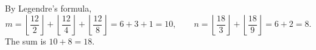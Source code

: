 By Legendre's formula,
\[
m=\left\lfloor\dfrac{12}{2}\right\rfloor+\left\lfloor\dfrac{12}{4}\right\rfloor+\left\lfloor\dfrac{12}{8}\right\rfloor=6+3+1=10,\qquad
n=\left\lfloor\dfrac{18}{3}\right\rfloor+\left\lfloor\dfrac{18}{9}\right\rfloor=6+2=8 .
\]
The sum is $10+8=\boxed{18}$.
